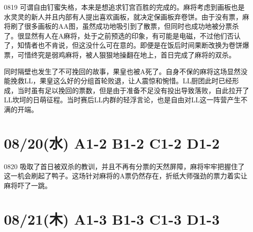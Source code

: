 0819 可谓自由钉蜜失格，本来是想追求钉宫百胜的完成的。麻将考虑到画板也是水灵灵的新人并且内部有人提出喜欢画板，就决定保画板弃卷饼。由于没有票，麻将刷了很多画板的AA图，虽然成功地吸引到了散票，但同时也成功地被分票杀了。很显然有人在A麻将，处于之前预选的印象，有可能是电磁，不过他们否认了，知情者也不肯说，但这没什么可在意的。即便是在饭后时间果断改换为卷饼爆票，可惜终究是弱鸡麻将，被人狠狠地操翻在地上，首日完成了麻将的双杀。

同时隔壁也发生了不可挽回的故事，果皇也被A死了。自身不保的麻将这场显然没能挽救LL，果皇这么好的分组首轮败退，让人震惊和惋惜。LL厨团此时已经形成，当时虽有足以挽回的票数，但是由于准备不足没有投出导致落败，自此拉开了LL坎坷的日萌征程。当时赛后LL内群的轻浮言论，也是自由对LL这一阵营产生不满的开端。

\section{08/20(水) A1-2 B1-2 C1-2 D1-2}


0820 吸取了首日被双杀的教训，并且不再有分票的天然屏障，麻将牢牢把握住了这一机会刷起了鸭子。这场针对麻将的A票仍然存在，折纸大师强劲的票力着实让麻将吓了一跳。

\section{08/21(木) A1-3 B1-3 C1-3 D1-3}

